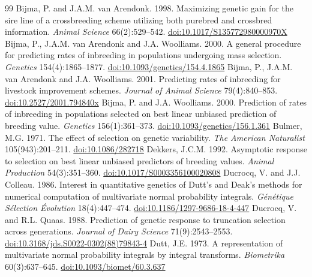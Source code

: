 \documentclass[11pt]{article}
\begin{document}
\begin{thebibliography}{99}
 Bijma, P. and J.A.M. van Arendonk. 1998. Maximizing genetic gain for the sire line of a crossbreeding scheme utilizing both purebred and crossbred information. \emph{Animal Science} 66(2):529--542. \href{https://doi.org/10.1017/S135772980000970X}{doi:10.1017/S135772980000970X}
 Bijma, P., J.A.M. van Arendonk and J.A. Woolliams. 2000. A general procedure for predicting rates of inbreeding in populations undergoing mass selection. \emph{Genetics} 154(4):1865--1877. \href{https://doi.org/10.1093/genetics/154.4.1865}{doi:10.1093/genetics/154.4.1865}
 Bijma, P., J.A.M. van Arendonk and J.A. Woolliams. 2001. Predicting rates of inbreeding for livestock improvement schemes. \emph{Journal of Animal Science} 79(4):840--853. \href{https://doi.org/10.2527/2001.794840x}{doi:10.2527/2001.794840x}
 Bijma, P. and J.A. Woolliams. 2000. Prediction of rates of inbreeding in populations selected on best linear unbiased prediction of breeding value. \emph{Genetics} 156(1):361--373. \href{https://doi.org/10.1093/genetics/156.1.361}{doi:10.1093/genetics/156.1.361}
 Bulmer, M.G. 1971. The effect of selection on genetic variability. \emph{The American Naturalist} 105(943):201--211. \href{https://doi.org/10.1086/282718}{doi:10.1086/282718}
 Dekkers, J.C.M. 1992. Asymptotic response to selection on best linear unbiased predictors of breeding values. \emph{Animal Production} 54(3):351--360. \href{https://doi.org/10.1017/S0003356100020808}{doi:10.1017/S0003356100020808}
 Ducrocq, V. and J.J. Colleau. 1986. Interest in quantitative genetics of Dutt's and Deak's methods for numerical computation of multivariate normal probability integrals. \emph{G\'en\'etique S\'election \'Evolution} 18(4):447--474. \href{https://doi.org/10.1186/1297-9686-18-4-447}{doi:10.1186/1297-9686-18-4-447}
 Ducrocq, V. and R.L. Quaas. 1988. Prediction of genetic response to truncation selection across generations. \emph{Journal of Dairy Science} 71(9):2543--2553. \href{https://doi.org/10.3168/jds.S0022-0302(88)79843-4}{doi:10.3168/jds.S0022-0302(88)79843-4}
 Dutt, J.E. 1973. A representation of multivariate normal probability integrals by integral transforms. \emph{Biometrika} 60(3):637--645. \href{https://doi.org/10.1093/biomet/60.3.637}{doi:10.1093/biomet/60.3.637}

\end{thebibliography}
\end{document}
